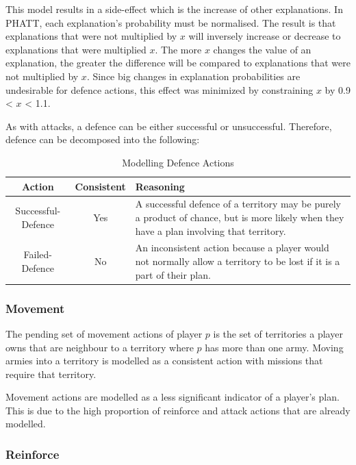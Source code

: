 \documentclass[parskip]{cs4rep}
\begin{document}
This model results in a side-effect which is the increase of other explanations. In PHATT, each explanation’s probability must be normalised. The result is that explanations that were not multiplied by $x$ will inversely increase or decrease to explanations that were multiplied $x$. The more $x$ changes the value of an explanation, the greater the difference will be compared to explanations that were not multiplied by $x$. Since big changes in explanation probabilities are undesirable for defence actions, this effect was minimized by constraining $x$ by 0.9 < $x$ < 1.1. 

As with attacks, a defence can be either successful or unsuccessful. Therefore, defence can be decomposed into the following: 

\begin{table}[ht]
\centering
\begin{tabular}{|c|c|p{8cm}|}
\hline 
\textbf{Action} & \textbf{Consistent}  & \textbf{Reasoning} \\ 
\hline 
Successful-Defence & Yes & A successful defence of a territory may be purely a product of chance, but is more likely when they have a plan involving that territory. \\ 
\hline 
Failed-Defence & No & An inconsistent action because a player would not normally allow a territory to be lost if it is a part of their plan. \\ 
\hline
\end{tabular}
\caption{Modelling Defence Actions}
\label{table:attack-defend-modelling}
\end{table}

\subsubsection{Movement}

The pending set of movement actions of player $p$ is the set of territories a player owns that are neighbour to a territory where $p$ has more than one army. Moving armies into a territory is modelled as a consistent action with missions that require that territory. 

Movement actions are modelled as a less significant indicator of a player’s plan. This is due to the high proportion of reinforce and attack actions that are already modelled. 

\subsubsection{Reinforce}
\end{document}
